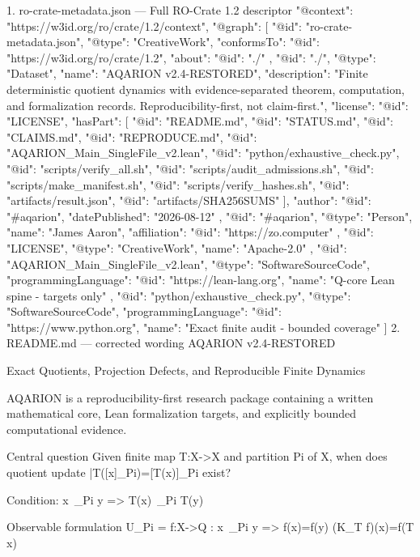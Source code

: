 1. ro-crate-metadata.json — Full RO-Crate 1.2 descriptor
{
  "@context": "https://w3id.org/ro/crate/1.2/context",
  "@graph": [
    {
      "@id": "ro-crate-metadata.json",
      "@type": "CreativeWork",
      "conformsTo": {"@id": "https://w3id.org/ro/crate/1.2"},
      "about": {"@id": "./"}
    },
    {
      "@id": "./",
      "@type": "Dataset",
      "name": "AQARION v2.4-RESTORED",
      "description": "Finite deterministic quotient dynamics with evidence-separated theorem, computation, and formalization records. Reproducibility-first, not claim-first.",
      "license": {"@id": "LICENSE"},
      "hasPart": [
        {"@id": "README.md"},
        {"@id": "STATUS.md"},
        {"@id": "CLAIMS.md"},
        {"@id": "REPRODUCE.md"},
        {"@id": "AQARION_Main_SingleFile_v2.lean"},
        {"@id": "python/exhaustive_check.py"},
        {"@id": "scripts/verify_all.sh"},
        {"@id": "scripts/audit_admissions.sh"},
        {"@id": "scripts/make_manifest.sh"},
        {"@id": "scripts/verify_hashes.sh"},
        {"@id": "artifacts/result.json"},
        {"@id": "artifacts/SHA256SUMS"}
      ],
      "author": {"@id": "#aqarion"},
      "datePublished": "2026-08-12"
    },
    {
      "@id": "#aqarion",
      "@type": "Person",
      "name": "James Aaron",
      "affiliation": {"@id": "https://zo.computer"}
    },
    {
      "@id": "LICENSE",
      "@type": "CreativeWork",
      "name": "Apache-2.0"
    },
    {
      "@id": "AQARION_Main_SingleFile_v2.lean",
      "@type": "SoftwareSourceCode",
      "programmingLanguage": {"@id": "https://lean-lang.org"},
      "name": "Q-core Lean spine - targets only"
    },
    {
      "@id": "python/exhaustive_check.py",
      "@type": "SoftwareSourceCode",
      "programmingLanguage": {"@id": "https://www.python.org"},
      "name": "Exact finite audit - bounded coverage"
    }
  ]
}
2. README.md — corrected wording
AQARION v2.4-RESTORED

Exact Quotients, Projection Defects, and Reproducible Finite Dynamics

AQARION is a reproducibility-first research package containing a written mathematical core, Lean formalization targets, and explicitly bounded computational evidence.

Central question
Given finite map T:X->X and partition Pi of X, when does quotient update \bar T([x]_Pi)=[T(x)]_Pi exist?

Condition: x~_Pi y => T(x)~_Pi T(y)

Observable formulation
U_Pi = { f:X->Q : x~_Pi y => f(x)=f(y) }
(K_T f)(x)=f(T x)


